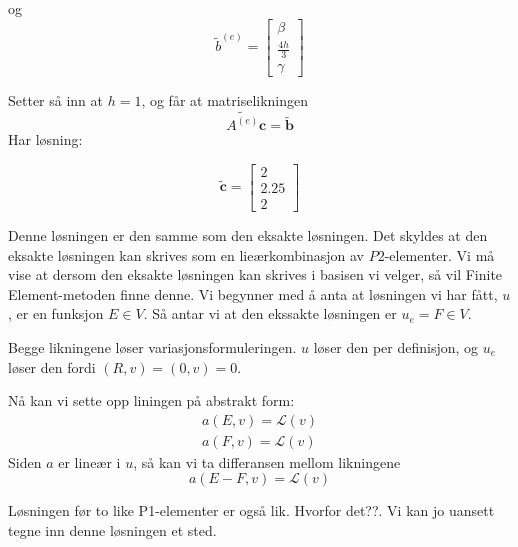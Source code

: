 \documentclass[a4paper, 10pt]{article}
\newcommand{\mb}{\mathbf}
\newcommand{\mc}{\mathcal}
\begin{document}
og
\begin{equation}
\tilde b^{(e)} =
\left\lbrack
\begin{array}{c}
\beta \\
\frac{4h}{3} \\
\gamma
\end{array}
\right\rbrack
\end{equation}

Setter så inn at $h=1$, og får at matriselikningen
\begin{equation}
	\tilde{A^{(e)}} \mb{c} = \tilde{\mb{b}}
	\end{equation}
Har løsning:

\begin{equation}
\tilde{\mb{c}}=
\left\lbrack
\begin{array}{c}
2 \\
2.25 \\
2
\end{array}
\right\rbrack
\end{equation}

Denne løsningen er den samme som den eksakte løsningen. Det skyldes at den eksakte løsningen kan skrives som en lieærkombinasjon av $P2$-elementer. Vi må vise at dersom den eksakte løsningen kan skrives i basisen vi velger, så vil Finite Element-metoden finne denne. 
Vi begynner med å anta at løsningen vi har fått, $u$, er en funksjon $E \in V$. Så antar vi at den ekssakte løsningen er $u_e = F \in V$.

Begge likningene løser variasjonsformuleringen. $u$ løser den per definisjon, og $u_e$ løser den fordi $(R, v) = (0, v) = 0$. 

Nå kan vi sette opp liningen på abstrakt form:
\begin{align}
	a(E, v) = \mc{L}(v) \\
	a(F, v) = \mc{L}(v)
\end{align}
Siden $a$ er lineær i $u$, så kan vi ta differansen mellom likningene
\begin{equation}
	a(E-F, v) = \mc{L}(v) 
\end{equation}

Løsningen før to like P1-elementer er også lik. Hvorfor det??. Vi kan jo uansett tegne inn denne løsningen et sted. 
\end{document}
